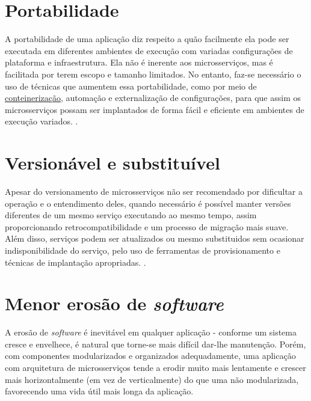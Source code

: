 \section{Portabilidade}\label{sec:portabilidade} %

A portabilidade de uma aplicação diz respeito a quão facilmente ela pode ser executada em diferentes ambientes de execução com variadas configurações de plataforma e infraestrutura. Ela não é inerente aos microsserviços, mas é facilitada por terem escopo e tamanho limitados. No entanto, faz-se necessário o uso de técnicas que aumentem essa portabilidade, como por meio de \hyperref[secao-conteinerizacao]{conteinerização}, automação e externalização de configurações, para que assim os microsserviços possam ser implantados de forma fácil e eficiente em ambientes de execução variados. \cite{Familiar2015}.

\section{Versionável e substituível}

Apesar do versionamento de microsserviços não ser recomendado por dificultar a operação e o entendimento deles, quando necessário é possível manter versões diferentes de um mesmo serviço executando ao mesmo tempo, assim proporcionando retrocompatibilidade e um processo de migração mais suave. Além disso, serviços podem ser atualizados ou mesmo substituidos sem ocasionar indisponibilidade do serviço, pelo uso de ferramentas de provisionamento e técnicas de implantação apropriadas. \cite{Familiar2015}.

\section{Menor erosão de \emph{software}}

A erosão de \emph{software} é inevitável em qualquer aplicação - conforme um sistema cresce e envelhece, é natural que torne-se mais difícil dar-lhe manutenção. Porém, com componentes modularizados e organizados adequadamente, uma aplicação com arquitetura de microsserviços tende a erodir muito mais lentamente e crescer mais horizontalmente (em vez de verticalmente) do que uma não modularizada, favorecendo uma vida útil mais longa da aplicação.



